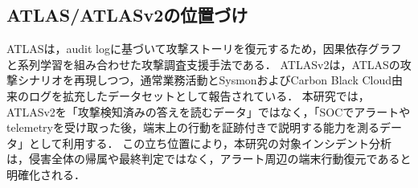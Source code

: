 \subsection{ATLAS/ATLASv2の位置づけ}

ATLASは，audit logに基づいて攻撃ストーリを復元するため，因果依存グラフと系列学習を組み合わせた攻撃調査支援手法である\cite{atlas}．
ATLASv2は，ATLASの攻撃シナリオを再現しつつ，通常業務活動とSysmonおよびCarbon Black Cloud由来のログを拡充したデータセットとして報告されている\cite{atlasv2}．
本研究では，ATLASv2を「攻撃検知済みの答えを読むデータ」ではなく，「SOCでアラートやtelemetryを受け取った後，端末上の行動を証跡付きで説明する能力を測るデータ」として利用する．
この立ち位置により，本研究の対象インシデント分析は，侵害全体の帰属や最終判定ではなく，アラート周辺の端末行動復元であると明確化される．


